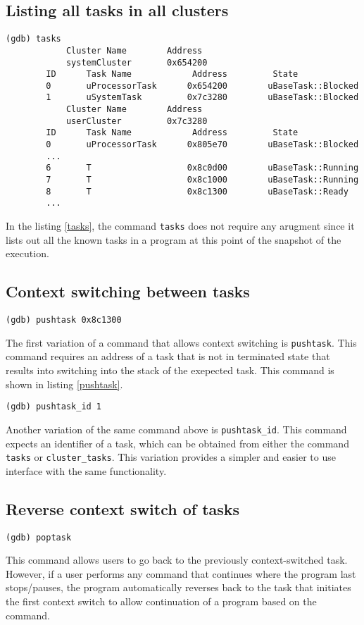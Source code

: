 \subsection{Listing all tasks in all clusters}
\begin{lstlisting}[caption={\text{tasks} command}, label={tasks}]
(gdb) tasks
            Cluster Name        Address
            systemCluster       0x654200
        ID      Task Name            Address         State
        0       uProcessorTask      0x654200        uBaseTask::Blocked
        1       uSystemTask         0x7c3280        uBaseTask::Blocked
            Cluster Name        Address
            userCluster         0x7c3280
        ID      Task Name            Address         State
        0       uProcessorTask      0x805e70        uBaseTask::Blocked
        ...
        6       T                   0x8c0d00        uBaseTask::Running
        7       T                   0x8c1000        uBaseTask::Running
        8       T                   0x8c1300        uBaseTask::Ready
        ...
\end{lstlisting}
In the listing \ref{tasks}, the command \verb|tasks| does not require any
arugment since it lists out all the known tasks in a \uCPPS program at this
point of the snapshot of the execution.

\subsection{Context switching between tasks}
\begin{lstlisting}[caption={\text{pushtask} command}, label={pushtask}]
(gdb) pushtask 0x8c1300
\end{lstlisting}
The first variation of a command that allows context switching is \verb|pushtask|. This command requires an
address of a task that is not in terminated state that results into switching
into the stack of the exepected task. This command is shown in listing
\ref{pushtask}.

\begin{lstlisting}[caption={\text{pushtask\_id} command}, label={pushtask-id}]
(gdb) pushtask_id 1
\end{lstlisting}
Another variation of the same command above is \verb|pushtask_id|. This command
expects an identifier of a task, which can be obtained from either the command \verb|tasks| or
\verb|cluster_tasks|. This variation provides a simpler and easier to use
interface with the same functionality.
\subsection{Reverse context switch of tasks}
\begin{lstlisting}[caption={\text{poptask} command}, label={poptask}]
(gdb) poptask
\end{lstlisting}
This command allows users to go back to the previously context-switched task.
However, if a user performs any command that continues where the program last
stops/pauses, the program automatically reverses back to the task that initiates
the first context switch to allow continuation of a program based on the
command.

